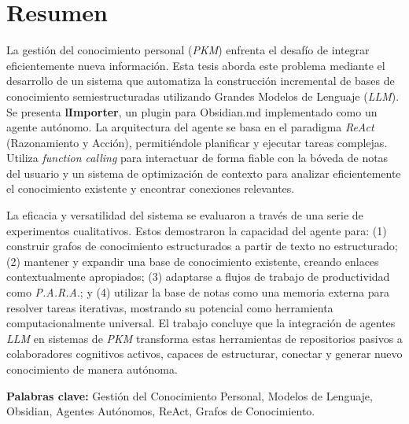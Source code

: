 \chapter*{Resumen}

La gestión del conocimiento personal (\textit{PKM}) enfrenta el desafío de integrar eficientemente nueva información. Esta tesis aborda este problema mediante el desarrollo de un sistema que automatiza la construcción incremental de bases de conocimiento semiestructuradas utilizando Grandes Modelos de Lenguaje (\textit{LLM}). Se presenta \textbf{lImporter}, un plugin para Obsidian.md implementado como un agente autónomo. La arquitectura del agente se basa en el paradigma \textit{ReAct} (Razonamiento y Acción), permitiéndole planificar y ejecutar tareas complejas. Utiliza \textit{function calling} para interactuar de forma fiable con la bóveda de notas del usuario y un sistema de optimización de contexto para analizar eficientemente el conocimiento existente y encontrar conexiones relevantes.

La eficacia y versatilidad del sistema se evaluaron a través de una serie de experimentos cualitativos. Estos demostraron la capacidad del agente para: (1) construir grafos de conocimiento estructurados a partir de texto no estructurado; (2) mantener y expandir una base de conocimiento existente, creando enlaces contextualmente apropiados; (3) adaptarse a flujos de trabajo de productividad como \textit{P.A.R.A}.; y (4) utilizar la base de notas como una memoria externa para resolver tareas iterativas, mostrando su potencial como herramienta computacionalmente universal. El trabajo concluye que la integración de agentes \textit{LLM} en sistemas de \textit{PKM} transforma estas herramientas de repositorios pasivos a colaboradores cognitivos activos, capaces de estructurar, conectar y generar nuevo conocimiento de manera autónoma.

\vspace{1cm}
\textbf{Palabras clave:} Gestión del Conocimiento Personal, Modelos de Lenguaje, Obsidian, Agentes Autónomos, ReAct, Grafos de Conocimiento.

